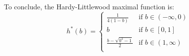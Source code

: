 \documentclass[12pt, letterpaper]{article}
\begin{document}
To conclude, the Hardy-Littlewood maximal function is:
\begin{equation}
h^*(b)=
    \begin{cases}
        \frac{1}{4(1-b)} & \text{if } b \in (-\infty,0)\\
        b & \text{if } b \in [0,1]\\
        \frac{b-\sqrt{b^2-1}}{2} & \text{if } b \in (1,\infty)\\
    \end{cases}
\end{equation}
\clearpage
\end{document}
